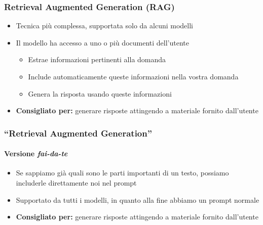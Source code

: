 \begin{contentframe}
    \frametitle{Retrieval Augmented Generation (RAG)}

    \begin{itemize}
        \item Tecnica più complessa, supportata solo da alcuni modelli
        
        \bigskip
        \item Il modello ha accesso a uno o più documenti dell'utente
        \begin{itemize}
            \item Estrae informazioni pertinenti alla domanda
            \item Include automaticamente queste informazioni nella vostra domanda
            \item Genera la risposta usando queste informazioni
        \end{itemize}

        \bigskip
        \item \textbf{Consigliato per:} generare risposte attingendo a materiale fornito dall'utente
    \end{itemize}
\end{contentframe}

\begin{contentframe}
    \frametitle{``Retrieval Augmented Generation''}
    \framesubtitle{Versione \textit{fai-da-te}}

    \begin{itemize}
        \item Se sappiamo già quali sono le parti importanti di un testo, possiamo includerle direttamente noi nel prompt
        
        \bigskip
        \item Supportato da tutti i modelli, in quanto alla fine abbiamo un prompt normale

        \bigskip
        \item \textbf{Consigliato per:} generare risposte attingendo a materiale fornito dall'utente
    \end{itemize}
\end{contentframe}

